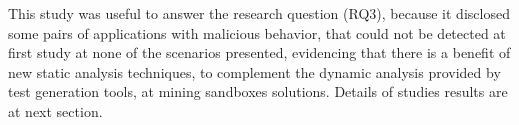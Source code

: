 This study was useful to answer the research question (RQ3), because it disclosed some pairs of applications with malicious behavior, that could not be detected at first study at none of the scenarios presented, evidencing that there is a benefit of new static analysis techniques, to complement the dynamic analysis provided by test generation tools, at mining sandboxes solutions. Details of studies results are at next section.





